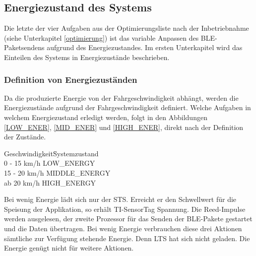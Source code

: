 \subsection{Energiezustand des Systems}
\label{v_energiezustand}

Die letzte der vier Aufgaben aus der Optimierungsliste nach der Inbetriebnahme (siehe Unterkapitel \ref{optimierung}) ist das variable Anpassen des BLE-Paketsendens aufgrund des Energiezustandes. Im ersten Unterkapitel wird das Einteilen des Systems in Energiezustände beschrieben. 

\subsubsection*{Definition von Energiezuständen}
\label{def_zustaende} 

Da die produzierte Energie von der Fahrgeschwindigkeit abhängt, werden die Energiezustände aufgrund der Fahrgeschwindigkeit definiert. Welche Aufgaben in welchem Energiezustand erledigt werden, folgt in den Abbildungen \ref{LOW_ENER}, \ref{MID_ENER} und \ref{HIGH_ENER}, direkt nach der Definition der Zustände. 

\begin{minipage}{\textwidth}
    \begin{tabbing}
       Geschwindigkeit\quad\= Systemzustand\\[0.8ex]
       0 - 15 km/h        \> LOW\_ENERGY\\
       15 - 20 km/h       \> MIDDLE\_ENERGY\\
       ab 20 km/h         \> HIGH\_ENERGY\\    
    \end{tabbing}
\end{minipage}

Bei wenig Energie lädt sich nur der STS. Erreicht er den Schwellwert für die Speisung der Applikation, so erhält TI-SensorTag Spannung. Die Reed-Impulse werden ausgelesen, der zweite Prozessor für das Senden der BLE-Pakete gestartet und die Daten übertragen. Bei wenig Energie verbrauchen diese drei Aktionen sämtliche zur Verfügung stehende Energie. Denn LTS hat sich nicht geladen. Die Energie genügt nicht für weitere Aktionen.

